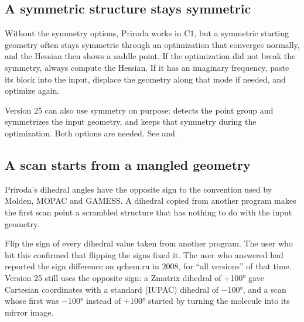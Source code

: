 \documentclass[letterpaper,10pt,english,openany,oneside]{sphinxmanual}
\begin{document}
\subsection{A symmetric structure stays symmetric}
\label{\detokenize{troubleshooting/common-problems:a-symmetric-structure-stays-symmetric}}
\sphinxAtStartPar
Without the symmetry options, Priroda works in C1, but a symmetric starting geometry often stays symmetric through
an optimization that converges normally, and the Hessian then shows a saddle point. If the optimization did not break the symmetry, always
compute the Hessian. If it has an imaginary frequency, paste its  block into the input, displace the
geometry along that mode if needed, and optimize again.



\sphinxAtStartPar
Version 25 can also use symmetry on purpose:  detects the point group and symmetrizes the
input geometry, and  keeps that symmetry during the optimization. Both options are needed. See
{\hyperref[\detokenize{reference/molecule:molecule-sym}]{}} and {\hyperref[\detokenize{reference/optimize:optimize-symmetry}]{}}.




\subsection{A scan starts from a mangled geometry}
\label{\detokenize{troubleshooting/common-problems:a-scan-starts-from-a-mangled-geometry}}
\sphinxAtStartPar
{} Priroda’s dihedral angles have the opposite sign to the convention used by Molden, MOPAC and GAMESS. A dihedral {\hyperref[\detokenize{reference/optimize:optimize-value}]{}} copied from another program makes the first scan point a
scrambled structure that has nothing to do with the input geometry.

\sphinxAtStartPar
{} Flip the sign of every dihedral value taken from another program. The user who hit this confirmed that
flipping the signs fixed it. The user who answered had reported the sign difference on qchem.ru in 2008, for
“all versions” of that time. Version 25 still uses the opposite sign: a Z\sphinxhyphen{}matrix dihedral of +100° gave Cartesian
coordinates with a standard (IUPAC) dihedral of −100°, and a scan whose first  was −100° instead of +100°
started by turning the molecule into its mirror image.
\end{document}
